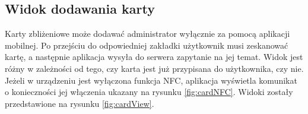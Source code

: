 \subsection{Widok dodawania karty}

Karty zbliżeniowe może dodawać administrator wyłącznie za pomocą aplikacji mobilnej. Po przejściu do odpowiedniej zakładki użytkownik musi zeskanować kartę, a następnie aplikacja wysyła do serwera zapytanie na jej temat. Widok jest różny w zależności od tego, czy karta jest już przypisana do użytkownika, czy nie. Jeżeli w urządzeniu jest wyłączona funkcja NFC, aplikacja wyświetla komunikat o konieczności jej włączenia ukazany na rysunku \ref{fig:cardNFC}. Widoki zostały przedstawione na rysunku \ref{fig:cardView}.

\begin{figure}[H]
    \centering
    \begin{subfigure}[b]{0.3\textwidth}
        \centering

\end{subfigure}
\end{figure}
